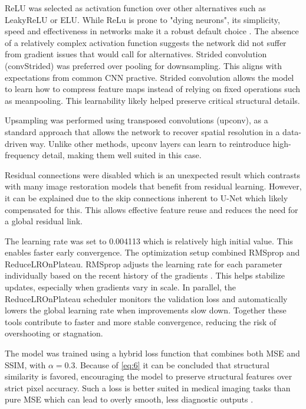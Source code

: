 \documentclass[twocolumn]{article}
\begin{document}
ReLU was selected as activation function over other alternatives such as LeakyReLU or ELU. 
While ReLu is prone to "dying neurons", its simplicity, speed and effectiveness in networks make it a robust default choice \cite{relu}. 
The absence of a relatively complex activation function suggests the network did not suffer from gradient issues that would call for alternatives. 
Strided convolution (convStrided) was preferred over pooling for downsampling. 
This aligns with expectations from common CNN practive. 
Strided convolution allows the model to learn how to compress feature maps instead of relying on fixed operations such as meanpooling. 
This learnability likely helped preserve critical structural details. 

Upsampling was performed using transposed convolutions (upconv), as a standard approach that allows the network to recover spatial resolution in a data-driven way. 
Unlike other methods, upconv layers can learn to reintroduce high-frequency detail, making them well suited in this case.

Residual connections were disabled which is an unexpected result which contrasts with many image restoration models that benefit from residual learning. 
However, it can be explained due to the skip connections inherent to U-Net which likely compensated for this. 
This allows effective feature reuse and reduces the need for a global residual link.

The learning rate was set to 0.004113 which is relatively high initial value. This enables faster early convergence. 
The optimization setup combined RMSprop and ReduceLROnPlateau. 
RMSprop adjusts the learning rate for each parameter individually based on the recent history of the gradients \cite{9036442}. 
This helps stabilize updates, especially when gradients vary in scale. 
In parallel, the ReduceLROnPlateau scheduler monitors the validation loss and automatically lowers the global learning rate when improvements slow down. 
Together these tools contribute to faster and more stable convergence, reducing the risk of overshooting or stagnation.

The model was trained using a hybrid loss function that combines both MSE and SSIM, with  $\alpha=0.3$. 
Because of \ref{eq:6} it can be concluded that structural similarity is favored, encouraging the model to preserve structural features over strict pixel accuracy. 
Such a loss is better suited in medical imaging tasks than pure MSE which can lead to overly smooth, less diagnostic outputs \cite{Dastmalchi}. 
\end{document}
